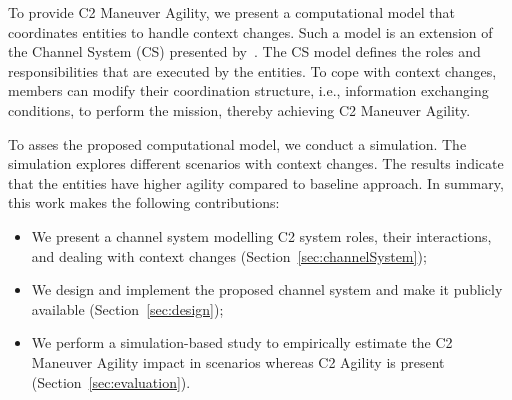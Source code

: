 
To provide C2 Maneuver Agility, we present a computational model that coordinates entities to handle context changes. Such a model is an extension of the Channel System (CS) presented by~\cite{modelcheckingBaier}. The CS model defines the roles and responsibilities that are executed by the entities. To cope with context changes, members can modify their coordination structure, i.e., information exchanging conditions, to perform the mission, thereby achieving C2 Maneuver Agility.


To asses the proposed computational model, we conduct a simulation. The simulation explores different scenarios with context changes. The results indicate that the entities have higher agility compared to baseline approach. In summary, this work makes the following contributions:

\begin{itemize}
    \item We present a channel system modelling C2 system roles, their interactions, and dealing with context changes (Section~\ref{sec:channelSystem});
    \item We design and implement the proposed channel system and make it  publicly available (Section~\ref{sec:design});
    \item We perform a simulation-based study to empirically estimate the C2 Maneuver Agility impact in scenarios whereas C2 Agility is present (Section~\ref{sec:evaluation}). 
\end{itemize}
